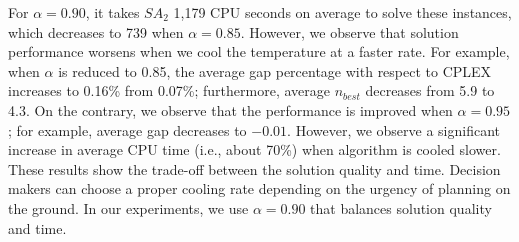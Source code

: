 \documentclass[11pt]{article}
\begin{document}
For $\alpha=0.90$, it takes $SA_2$ 1,179 CPU seconds on average to solve these instances, which decreases to 739 when $\alpha=0.85$. However, we observe that solution performance worsens when we cool the temperature at a faster rate. For example,  when $\alpha$ is reduced to 0.85, the average gap percentage with respect to CPLEX increases to 0.16\% from 0.07\%; furthermore, average $n_{best}$ decreases from 5.9 to 4.3. On the contrary, we observe that the performance is improved when $\alpha=0.95$; for example, average gap decreases to $-0.01$. However, we observe a significant increase in average CPU time (i.e., about 70\%) when algorithm is cooled slower. These results show the trade-off between the solution quality and time. Decision makers can choose a proper cooling rate depending on the urgency of planning on the ground. In our experiments, we use $\alpha=0.90$ that balances solution quality and time.
\end{document}
